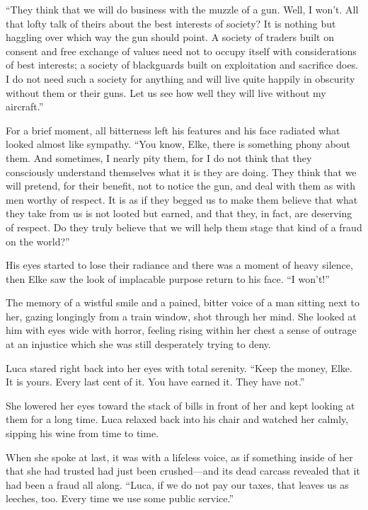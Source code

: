 ``They think that we will do business with the muzzle of a gun. Well, I won't. All that lofty talk of theirs about the best interests of society? It is nothing but haggling over which way the gun should point. A society of traders built on consent and free exchange of values need not to occupy itself with considerations of best interests; a society of blackguards built on exploitation and sacrifice does. I do not need such a society for anything and will live quite happily in obscurity without them or their guns. Let us see how well they will live without my aircraft.''

For a brief moment, all bitterness left his features and his face radiated what looked almost like sympathy. ``You know, Elke, there is something phony about them. And sometimes, I nearly pity them, for I do not think that they consciously understand themselves what it is they are doing. They think that we will pretend, for their benefit, not to notice the gun, and deal with them as with men worthy of respect. It is as if they begged us to make them believe that what they take from us is not looted but earned, and that they, in fact, are deserving of respect. Do they truly believe that we will help them stage that kind of a fraud on the world?''

His eyes started to lose their radiance and there was a moment of heavy silence, then Elke saw the look of implacable purpose return to his face. ``I won't!''

The memory of a wistful smile and a pained, bitter voice of a man sitting next to her, gazing longingly from a train window, shot through her mind. She looked at him with eyes wide with horror, feeling rising within her chest a sense of outrage at an injustice which she was still desperately trying to deny.

Luca stared right back into her eyes with total serenity. ``Keep the money, Elke. It is yours. Every last cent of it. You have earned it. They have not.''

She lowered her eyes toward the stack of bills in front of her and kept looking at them for a long time. Luca relaxed back into his chair and watched her calmly, sipping his wine from time to time.

When she spoke at last, it was with a lifeless voice, as if something inside of her that she had trusted had just been crushed---and its dead carcass revealed that it had been a fraud all along. ``Luca, if we do not pay our taxes, that leaves us as leeches, too. Every time we use some public service.''

